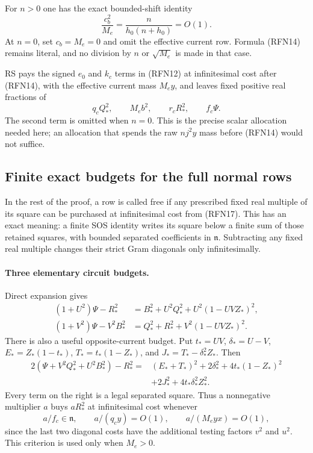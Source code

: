 For $n>0$ one has the exact bounded-shift identity
\[
 \frac{c_b^2}{M_e}=\frac{n}{h_0(n+h_0)}=O(1).
                                                               \tag{RFN16}
\]
At $n=0$, set $c_b=M_e=0$ and omit the effective current row.  Formula
(RFN14) remains literal, and no division by $n$ or $\sqrt{M_e}$ is
made in that case.

RS pays the signed $e_0$ and $k_c$ terms in (RFN12) at infinitesimal
cost after (RFN14), with the effective current mass $M_e y$, and leaves
fixed positive real fractions of
\[
 q_cQ_*^2,\qquad M_e b^2,\qquad r_cR_*^2,\qquad f_c\Psi. \tag{RFN17}
\]
The second term is omitted when $n=0$.  This is the precise scalar
allocation needed here; an allocation that spends the raw $nj^2y$
mass before (RFN14) would not suffice.

\subsection{Finite exact budgets for the full normal rows}

In the rest of the proof, a row is called free if any prescribed fixed
real multiple of its square can be purchased at infinitesimal cost
from (RFN17).  This has an exact meaning: a finite SOS identity writes
its square below a finite sum of those retained squares, with bounded
separated coefficients in $\mathfrak n$.  Subtracting any fixed real
multiple changes their strict Gram diagonals only infinitesimally.

\paragraph{Three elementary circuit budgets.}
Direct expansion gives
\begin{align}
 (1+U^2)\Psi-R_*^2
     &=B_*^2+U^2Q_*^2+U^2(1-UVZ_*)^2,                  \tag{RFN18a}\\
 (1+V^2)\Psi-V^2B_*^2
     &=Q_*^2+R_*^2+V^2(1-UVZ_*)^2.                   \tag{RFN18b}
\end{align}
There is also a useful opposite-current budget.  Put
$t_*=UV$, $\delta_*=U-V$, $E_*=Z_*(1-t_*)$,
$T_*=t_*(1-Z_*)$, and $J_*=T_*-\delta_*^2Z_*$.  Then
\begin{align}
 2(\Psi+V^2Q_*^2+U^2B_*^2)-R_*^2
 ={}&(E_*+T_*)^2+2\delta_*^2+4t_*(1-Z_*)^2\\
   &+2J_*^2+4t_*\delta_*^2Z_*^2.                      \tag{RFN18c}
\end{align}
Every term on the right is a legal separated square.  Thus a
nonnegative multiplier $a$ buys $aR_*^2$ at infinitesimal cost whenever
\[
 a/f_c\in\mathfrak n,\qquad a/(q_cy)=O(1),\qquad
 a/(M_e yx)=O(1),                                      \tag{RFN18d}
\]
since the last two diagonal costs have the additional testing factors
$v^2$ and $u^2$.  This criterion is used only when $M_e>0$.

